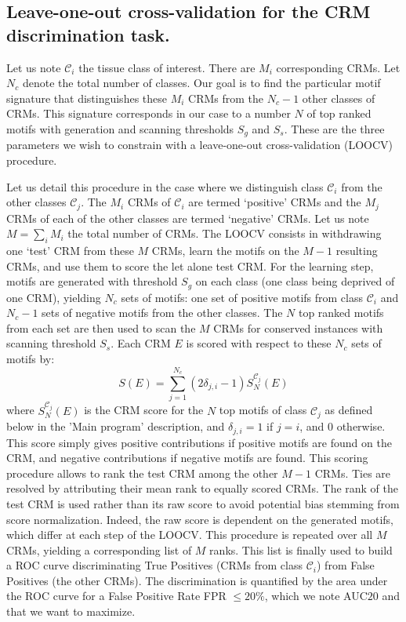 \documentclass[a4,center,fleqn]{NAR}
\begin{document}
\subsection*{Leave-one-out cross-validation for the  CRM discrimination task.}
Let us note $\mathcal{C}_i$ the tissue class of interest. 
There are $M_i$ corresponding CRMs.
Let $N_c$ denote the total number of classes.
Our goal is to find the particular motif signature that distinguishes these
$M_i$ CRMs from the $N_c-1$ other classes of CRMs.
This signature corresponds in our case to a number $N$ of top ranked motifs
with generation and scanning thresholds $S_g$ and  $S_s$.
These are the three parameters we wish to constrain with a leave-one-out
cross-validation (LOOCV) procedure. 

Let us detail this procedure in the case where we distinguish class
$\mathcal{C}_i$ from the other classes $\mathcal{C}_j$.
The $M_i$ CRMs of $\mathcal{C}_i$ are termed `positive' CRMs and the $M_j$ CRMs
of each of the other classes are termed `negative' CRMs.
Let us note $M=\sum_i M_i$ the total number of CRMs.
The LOOCV consists in withdrawing one `test' CRM from these $M$ CRMs, learn the
motifs on the $M-1$ resulting CRMs, and use them to score the let alone test
CRM.
For the learning step, motifs are generated with threshold $S_g$ on each class
(one class being deprived of one CRM), yielding $N_c$ sets of motifs: one set
of positive motifs from class $\mathcal{C}_i$ and $N_c-1$ sets of negative
motifs from the other classes.
The $N$ top ranked motifs from each set are then used to scan the $M$ CRMs for
conserved instances with scanning threshold $S_s$.
Each CRM $E$ is scored with respect to these $N_c$ sets of motifs by:
\begin{equation}
    S(E) = \sum_{j=1}^{N_c} (2\delta_{j,i} - 1) S_N^{\mathcal{C}_j}(E) 
    \label{score_enh}
\end{equation}
where $ S_N^{\mathcal{C}_j}(E)$ is the CRM score for the $N$ top motifs of
class $\mathcal{C}_j$ as defined below in the 'Main program' description, and
$\delta_{j,i}=1$ if $j=i$, and $0$ otherwise.
This score simply gives positive contributions if positive motifs are found on
the CRM, and negative contributions if negative motifs are found.
This scoring procedure allows to rank the test CRM among the other $M-1$ CRMs.
Ties are resolved by attributing their mean rank to equally scored CRMs.
The rank of the test CRM is used rather than its raw score to avoid potential
bias stemming from score normalization.
Indeed, the raw score is dependent on the generated motifs, which differ at
each step of the LOOCV.
This procedure is repeated over all $M$ CRMs, yielding a corresponding list of
$M$ ranks.
This list is finally used to build a ROC curve discriminating True Positives
(CRMs from class $\mathcal{C}_i$) from False Positives (the other CRMs).
The discrimination is quantified by the area under the ROC curve for a False
Positive Rate FPR $ \leq 20\%$, which we note AUC$20$ and that we want to
maximize.
\end{document}
